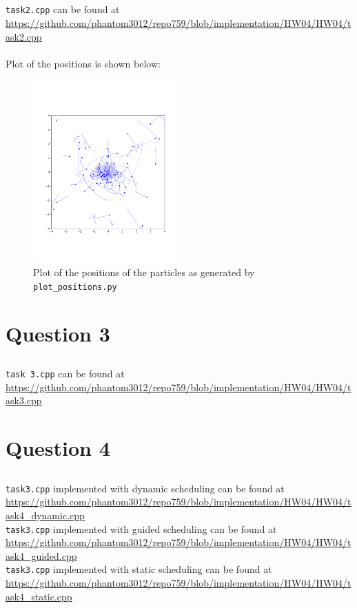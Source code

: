 \documentclass[12pt]{article}
\begin{document}
\subsection{}
\texttt{task2.cpp} can be found at \url{https://github.com/phantom3012/repo759/blob/implementation/HW04/HW04/task2.cpp} \\ \\
Plot of the positions is shown below:
\begin{figure}[ht]
    \centering
    \includegraphics[width=0.5\textwidth]{nbody-cpp.png}
    \caption{Plot of the positions of the particles as generated by \texttt{plot\_positions.py}}
\end{figure}
\section{Question 3}
\subsection{}
\texttt{task 3.cpp} can be found at \url{https://github.com/phantom3012/repo759/blob/implementation/HW04/HW04/task3.cpp}

\section{Question 4}
\subsection{}
\texttt{task3.cpp} implemented with dynamic scheduling can be found at \url{https://github.com/phantom3012/repo759/blob/implementation/HW04/HW04/task4_dynamic.cpp} \\
\texttt{task3.cpp} implemented with guided scheduling can be found at \url{https://github.com/phantom3012/repo759/blob/implementation/HW04/HW04/task4_guided.cpp} \\
\texttt{task3.cpp} implemented with static scheduling can be found at \url{https://github.com/phantom3012/repo759/blob/implementation/HW04/HW04/task4_static.cpp} \\
\end{document}
